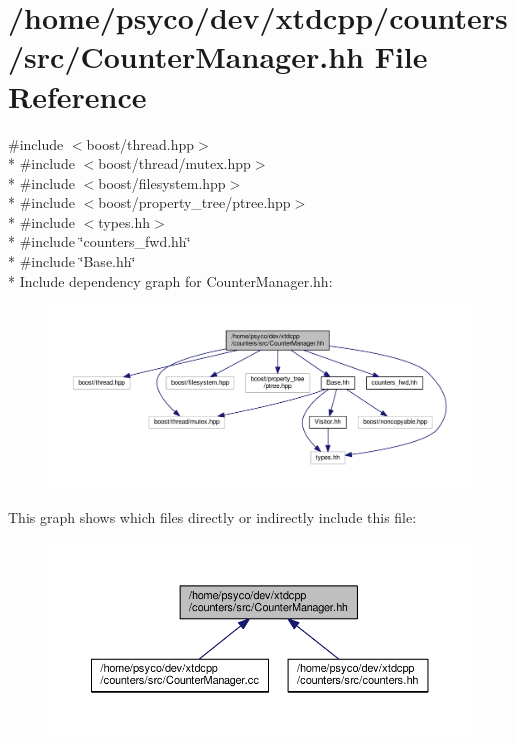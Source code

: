 \hypertarget{CounterManager_8hh}{}\section{/home/psyco/dev/xtdcpp/counters/src/\+Counter\+Manager.hh File Reference}
\label{CounterManager_8hh}
{\ttfamily \#include $<$boost/thread.\+hpp$>$}\\*
{\ttfamily \#include $<$boost/thread/mutex.\+hpp$>$}\\*
{\ttfamily \#include $<$boost/filesystem.\+hpp$>$}\\*
{\ttfamily \#include $<$boost/property\+\_\+tree/ptree.\+hpp$>$}\\*
{\ttfamily \#include $<$types.\+hh$>$}\\*
{\ttfamily \#include \char`\"{}counters\+\_\+fwd.\+hh\char`\"{}}\\*
{\ttfamily \#include \char`\"{}Base.\+hh\char`\"{}}\\*
Include dependency graph for Counter\+Manager.\+hh\+:
\nopagebreak
\begin{figure}[H]
\begin{center}
\leavevmode
\includegraphics[width=350pt]{CounterManager_8hh__incl}
\end{center}
\end{figure}
This graph shows which files directly or indirectly include this file\+:
\nopagebreak
\begin{figure}[H]
\begin{center}
\leavevmode
\includegraphics[width=350pt]{CounterManager_8hh__dep__incl}
\end{center}
\end{figure}
